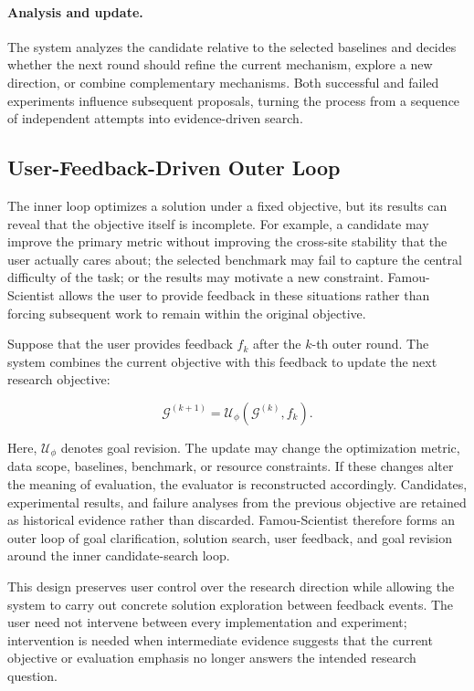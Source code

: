 \paragraph{Analysis and update.}
The system analyzes the candidate relative to the selected baselines and decides whether the next round should refine the current mechanism, explore a new direction, or combine complementary mechanisms. Both successful and failed experiments influence subsequent proposals, turning the process from a sequence of independent attempts into evidence-driven search.

\subsection{User-Feedback-Driven Outer Loop}
\label{sec:agent_outer_loop}

The inner loop optimizes a solution under a fixed objective, but its results can reveal that the objective itself is incomplete. For example, a candidate may improve the primary metric without improving the cross-site stability that the user actually cares about; the selected benchmark may fail to capture the central difficulty of the task; or the results may motivate a new constraint. Famou-Scientist allows the user to provide feedback in these situations rather than forcing subsequent work to remain within the original objective.

Suppose that the user provides feedback $f_k$ after the $k$-th outer round. The system combines the current objective with this feedback to update the next research objective:

\begin{equation}
\mathcal{G}^{(k+1)}=\mathcal{U}_{\phi}(\mathcal{G}^{(k)},f_k).
\end{equation}

Here, $\mathcal{U}_{\phi}$ denotes goal revision. The update may change the optimization metric, data scope, baselines, benchmark, or resource constraints. If these changes alter the meaning of evaluation, the evaluator is reconstructed accordingly. Candidates, experimental results, and failure analyses from the previous objective are retained as historical evidence rather than discarded. Famou-Scientist therefore forms an outer loop of goal clarification, solution search, user feedback, and goal revision around the inner candidate-search loop.

This design preserves user control over the research direction while allowing the system to carry out concrete solution exploration between feedback events. The user need not intervene between every implementation and experiment; intervention is needed when intermediate evidence suggests that the current objective or evaluation emphasis no longer answers the intended research question.

